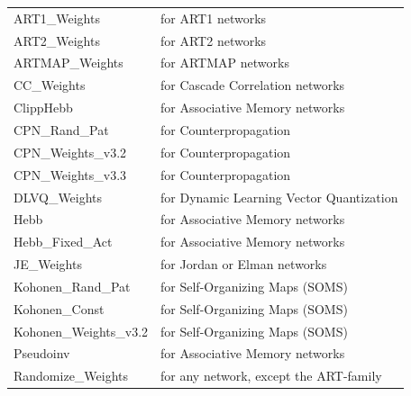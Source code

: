 {\newpage
\clearpage
\samepage \begin{tabular}{|l|l|}
\hline
ART1\_Weights \hspace{0.5cm}         & for ART1 networks\\ 
ART2\_Weights \hspace{0.5cm}         & for ART2 networks\\ 
ARTMAP\_Weights \hspace{0.5cm}       & for ARTMAP networks\\ 
CC\_Weights \hspace{0.5cm}           & for Cascade Correlation networks\\ 
ClippHebb \hspace{0.5cm}             & for Associative Memory networks\\ 
CPN\_Rand\_Pat \hspace{0.5cm}        & for Counterpropagation\\ 
CPN\_Weights\_v3.2 \hspace{0.5cm}    & for Counterpropagation\\ 
CPN\_Weights\_v3.3 \hspace{0.5cm}    & for Counterpropagation\\ 
DLVQ\_Weights \hspace{0.5cm}        & for Dynamic Learning Vector Quantization\\ 
Hebb \hspace{0.5cm}                  & for Associative Memory networks\\ 
Hebb\_Fixed\_Act \hspace{0.5cm}      & for Associative Memory networks\\ 
JE\_Weights \hspace{0.5cm}           & for Jordan or Elman networks\\ 
Kohonen\_Rand\_Pat \hspace{0.5cm}    & for Self-Organizing Maps (SOMS)\\ 
Kohonen\_Const \hspace{0.5cm}        & for Self-Organizing Maps (SOMS)\\ 
Kohonen\_Weights\_v3.2 \hspace{0.5cm}& for Self-Organizing Maps (SOMS)\\ 
Pseudoinv \hspace{0.5cm}             & for Associative Memory networks\\ 
Randomize\_Weights \hspace{0.5cm}    & for any network, except the ART-family\\ 

\end{tabular}}
